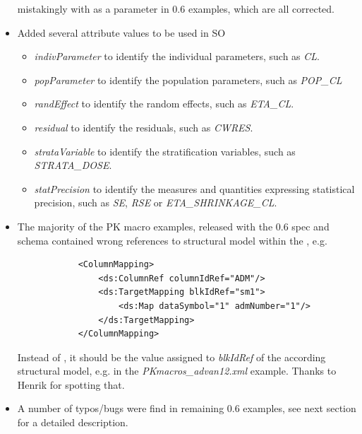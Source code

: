 \begin{itemize}
mistakingly with as a parameter in 0.6 examples, which are all corrected.
\item 
Added several  attribute values to be used in SO
\begin{itemize}
\item
\emph{indivParameter} to identify the individual parameters, such as \emph{CL}.
\item
\emph{popParameter} to identify the population parameters, such as \emph{POP\_CL}
\item
\emph{randEffect} to identify the random effects, such as \emph{ETA\_CL}.
\item
\emph{residual} to identify the residuals, such as \emph{CWRES}.
\item
\emph{strataVariable} to identify the stratification variables, such as \emph{STRATA\_DOSE}.
\item
\emph{statPrecision} to identify the measures and quantities expressing
statistical precision, such as \emph{SE}, \emph{RSE} or \emph{ETA\_SHRINKAGE\_CL}.
\end{itemize}
\end{itemize}

\begin{itemize}
\item 
The majority of the PK macro examples, released with the 0.6 spec and schema 
contained wrong references to structural model within the , e.g.
\lstset{language=XML}
\begin{lstlisting}
            <ColumnMapping>
                <ds:ColumnRef columnIdRef="ADM"/>
                <ds:TargetMapping blkIdRef="sm1">
                    <ds:Map dataSymbol="1" admNumber="1"/>
                </ds:TargetMapping>
            </ColumnMapping>
\end{lstlisting}
Instead of , it should be the value assigned to \emph{blkIdRef} of the 
according structural model, e.g.  in the \emph{PKmacros\_advan12.xml} 
example. Thanks to Henrik for spotting that.
\item
A number of typos/bugs were find in remaining 0.6 examples, see next section for
a detailed description.
\end{itemize}

%

